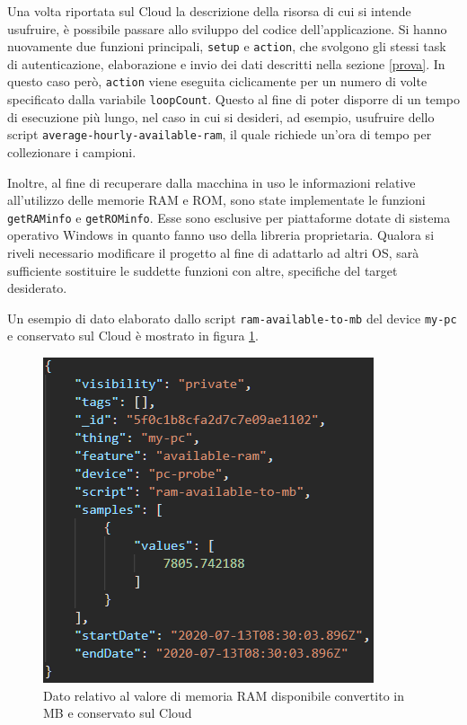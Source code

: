 Una volta riportata sul Cloud la descrizione della risorsa di cui si intende usufruire, è possibile passare allo sviluppo del codice dell'applicazione. Si hanno nuovamente due funzioni principali, \texttt{setup} e \texttt{action}, che svolgono gli stessi task di autenticazione, elaborazione e invio dei dati descritti nella sezione \ref{prova}. In questo caso però, \texttt{action} viene eseguita ciclicamente per un numero di volte specificato dalla variabile \texttt{loopCount}. Questo al fine di poter disporre di un tempo di esecuzione più lungo, nel caso in cui si desideri, ad esempio, usufruire dello script \texttt{average-hourly-available-ram}, il quale richiede un'ora di tempo per collezionare i campioni.

Inoltre, al fine di recuperare dalla macchina in uso le informazioni relative all'utilizzo delle memorie RAM e ROM, sono state implementate le funzioni \texttt{getRAMinfo} e  \texttt{getROMinfo}. Esse sono esclusive per piattaforme dotate di sistema operativo Windows in quanto fanno uso della libreria proprietaria. Qualora si riveli necessario modificare il progetto al fine di adattarlo ad altri OS, sarà sufficiente sostituire le suddette funzioni con altre, specifiche del target desiderato.

Un esempio di dato elaborato dallo script \texttt{ram-available-to-mb} del device \texttt{my-pc} e conservato sul Cloud è mostrato in figura \ref{datowin}.

\begin{figure}[H]
	\centering
	\includegraphics[scale=0.7]{pics/datowin}
	\caption{Dato relativo al valore di memoria RAM disponibile convertito in MB e conservato sul Cloud}
	\label{datowin}
\end{figure}

